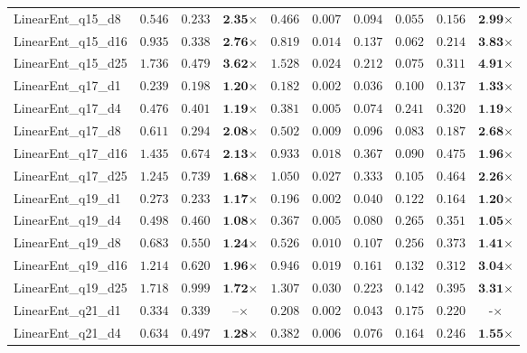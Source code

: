 \begin{table*}[t]
{\begin{tabular}{| l || r r c || r r r r r c |}
LinearEnt\_q15\_d8 & $0.546$ & $0.233$ & $\textbf{2.35}$$\times$ & $0.466$ & $0.007$ & $0.094$ & $0.055$ & $0.156$ & $\textbf{2.99}$$\times$ \\
LinearEnt\_q15\_d16 & $0.935$ & $0.338$ & $\textbf{2.76}$$\times$ & $0.819$ & $0.014$ & $0.137$ & $0.062$ & $0.214$ & $\textbf{3.83}$$\times$ \\
LinearEnt\_q15\_d25 & $1.736$ & $0.479$ & $\textbf{3.62}$$\times$ & $1.528$ & $0.024$ & $0.212$ & $0.075$ & $0.311$ & $\textbf{4.91}$$\times$ \\
LinearEnt\_q17\_d1 & $0.239$ & $0.198$ & $\textbf{1.20}$$\times$ & $0.182$ & $0.002$ & $0.036$ & $0.100$ & $0.137$ & $\textbf{1.33}$$\times$ \\
LinearEnt\_q17\_d4 & $0.476$ & $0.401$ & $\textbf{1.19}$$\times$ & $0.381$ & $0.005$ & $0.074$ & $0.241$ & $0.320$ & $\textbf{1.19}$$\times$ \\
LinearEnt\_q17\_d8 & $0.611$ & $0.294$ & $\textbf{2.08}$$\times$ & $0.502$ & $0.009$ & $0.096$ & $0.083$ & $0.187$ & $\textbf{2.68}$$\times$ \\
LinearEnt\_q17\_d16 & $1.435$ & $0.674$ & $\textbf{2.13}$$\times$ & $0.933$ & $0.018$ & $0.367$ & $0.090$ & $0.475$ & $\textbf{1.96}$$\times$ \\
LinearEnt\_q17\_d25 & $1.245$ & $0.739$ & $\textbf{1.68}$$\times$ & $1.050$ & $0.027$ & $0.333$ & $0.105$ & $0.464$ & $\textbf{2.26}$$\times$ \\
LinearEnt\_q19\_d1 & $0.273$ & $0.233$ & $\textbf{1.17}$$\times$ & $0.196$ & $0.002$ & $0.040$ & $0.122$ & $0.164$ & $\textbf{1.20}$$\times$ \\
LinearEnt\_q19\_d4 & $0.498$ & $0.460$ & $\textbf{1.08}$$\times$ & $0.367$ & $0.005$ & $0.080$ & $0.265$ & $0.351$ & $\textbf{1.05}$$\times$ \\
LinearEnt\_q19\_d8 & $0.683$ & $0.550$ & $\textbf{1.24}$$\times$ & $0.526$ & $0.010$ & $0.107$ & $0.256$ & $0.373$ & $\textbf{1.41}$$\times$ \\
LinearEnt\_q19\_d16 & $1.214$ & $0.620$ & $\textbf{1.96}$$\times$ & $0.946$ & $0.019$ & $0.161$ & $0.132$ & $0.312$ & $\textbf{3.04}$$\times$ \\
LinearEnt\_q19\_d25 & $1.718$ & $0.999$ & $\textbf{1.72}$$\times$ & $1.307$ & $0.030$ & $0.223$ & $0.142$ & $0.395$ & $\textbf{3.31}$$\times$ \\
LinearEnt\_q21\_d1 & $0.334$ & $0.339$ & $\textbf{--}$$\times$ & $0.208$ & $0.002$ & $0.043$ & $0.175$ & $0.220$ & $\textbf{-}$$\times$ \\
LinearEnt\_q21\_d4 & $0.634$ & $0.497$ & $\textbf{1.28}$$\times$ & $0.382$ & $0.006$ & $0.076$ & $0.164$ & $0.246$ & $\textbf{1.55}$$\times$ \\

\end{tabular}}
\end{table*}
